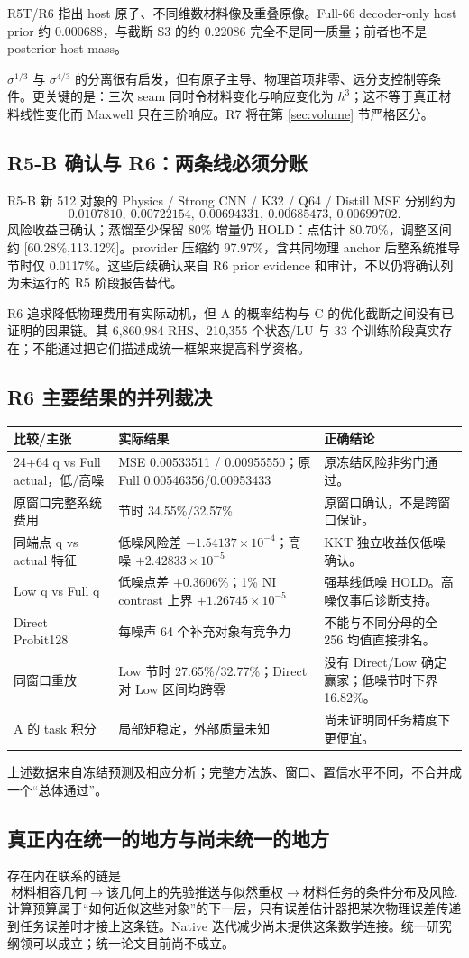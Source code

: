 R5T/R6 指出 host 原子、不同维数材料像及重叠原像。Full-66 decoder-only host prior 约 0.000688，与截断 S3 的约 0.22086 完全不是同一质量；前者也不是 posterior host mass。

$\sigma^{1/3}$ 与 $\sigma^{4/3}$ 的分离很有启发，但有原子主导、物理首项非零、远分支控制等条件。更关键的是：三次 seam 同时令材料变化与响应变化为 $h^3$；这不等于真正材料线性变化而 Maxwell 只在三阶响应。R7 将在第 \ref{sec:volume} 节严格区分。

\subsection{R5-B 确认与 R6：两条线必须分账}
R5-B 新 512 对象的 Physics / Strong CNN / K32 / Q64 / Distill MSE 分别约为
\[
0.0107810,\ 0.00722154,\ 0.00694331,\ 0.00685473,\ 0.00699702.
\]
风险收益已确认；蒸馏至少保留 80\% 增量仍 HOLD：点估计 80.70\%，调整区间约 [60.28\%,113.12\%]。provider 压缩约 97.97\%，含共同物理 anchor 后整系统推导节时仅 0.0117\%。这些后续确认来自 R6 prior evidence 和审计，不以仍将确认列为未运行的 R5 阶段报告替代。

R6 追求降低物理费用有实际动机，但 A 的概率结构与 C 的优化截断之间没有已证明的因果链。其 6,860,984 RHS、210,355 个状态/LU 与 33 个训练阶段真实存在；不能通过把它们描述成统一框架来提高科学资格。

\subsection{R6 主要结果的并列裁决}
\begin{longtable}{p{.34\linewidth}p{.26\linewidth}p{.32\linewidth}}
\toprule
比较/主张 & 实际结果 & 正确结论\\
\midrule
24+64 q vs Full actual，低/高噪 & MSE 0.00533511 / 0.00955550；原 Full 0.00546356/0.00953433 & 原冻结风险非劣门通过。\\
原窗口完整系统费用 & 节时 34.55\%/32.57\% & 原窗口确认，不是跨窗口保证。\\
同端点 q vs actual 特征 & 低噪风险差 $-1.54137\times10^{-4}$；高噪 $+2.42833\times10^{-5}$ & KKT 独立收益仅低噪确认。\\
Low q vs Full q & 低噪点差 +0.3606\%；1\% NI contrast 上界 $+1.26745\times10^{-5}$ & 强基线低噪 HOLD。高噪仅事后诊断支持。\\
Direct Probit128 & 每噪声 64 个补充对象有竞争力 & 不能与不同分母的全 256 均值直接排名。\\
同窗口重放 & Low 节时 27.65\%/32.77\%；Direct 对 Low 区间均跨零 & 没有 Direct/Low 确定赢家；低噪节时下界 16.82\%。\\
A 的 task 积分 & 局部矩稳定，外部质量未知 & 尚未证明同任务精度下更便宜。\\
\bottomrule
\end{longtable}
上述数据来自冻结预测及相应分析；完整方法族、窗口、置信水平不同，不合并成一个“总体通过”。

\subsection{真正内在统一的地方与尚未统一的地方}
存在内在联系的链是
\[
\text{材料相容几何}
\longrightarrow
\text{该几何上的先验推送与似然重权}
\longrightarrow
\text{材料任务的条件分布及风险}.
\]
计算预算属于“如何近似这些对象”的下一层，只有误差估计器把某次物理误差传递到任务误差时才接上这条链。Native 迭代减少尚未提供这条数学连接。统一研究纲领可以成立；统一论文目前尚不成立。

